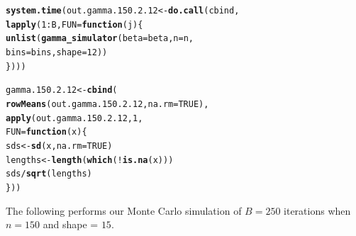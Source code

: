 \documentclass[11pt]{article}\usepackage[]{graphicx}\usepackage[]{color}
\makeatletter
\newcommand{\hlnum}[1]{\textcolor[rgb]{0.686,0.059,0.569}{#1}}%
\newcommand{\hlopt}[1]{\textcolor[rgb]{0,0,0}{#1}}%
\newcommand{\hlstd}[1]{\textcolor[rgb]{0.345,0.345,0.345}{#1}}%
\newcommand{\hlkwa}[1]{\textcolor[rgb]{0.161,0.373,0.58}{\textbf{#1}}}%
\newcommand{\hlkwb}[1]{\textcolor[rgb]{0.69,0.353,0.396}{#1}}%
\newcommand{\hlkwc}[1]{\textcolor[rgb]{0.333,0.667,0.333}{#1}}%
\newcommand{\hlkwd}[1]{\textcolor[rgb]{0.737,0.353,0.396}{\textbf{#1}}}%
\newenvironment{kframe}{%
 \def\at@end@of@kframe{}%
 \ifinner\ifhmode%
  \def\at@end@of@kframe{\end{minipage}}%
  \begin{minipage}{\columnwidth}%
 \fi\fi%
 \def\FrameCommand##1{\hskip\@totalleftmargin \hskip-\fboxsep
 \colorbox{shadecolor}{##1}\hskip-\fboxsep
     \hskip-\linewidth \hskip-\@totalleftmargin \hskip\columnwidth}%
 \MakeFramed {\advance\hsize-\width
   \@totalleftmargin\z@ \linewidth\hsize
   \@setminipage}}%
 {\par\unskip\endMakeFramed%
 \at@end@of@kframe}
\newenvironment{knitrout}{}{} %
\makeatother
\begin{document}
\begin{knitrout}
\color{fgcolor}\begin{kframe}
\begin{alltt}
\hlkwd{system.time}\hlstd{(out.gamma.150.2.12} \hlkwb{<-} \hlkwd{do.call}\hlstd{(cbind,}
  \hlkwd{lapply}\hlstd{(}\hlnum{1}\hlopt{:}\hlstd{B,} \hlkwc{FUN} \hlstd{=} \hlkwa{function}\hlstd{(}\hlkwc{j}\hlstd{)\{}
    \hlkwd{unlist}\hlstd{(}\hlkwd{gamma_simulator}\hlstd{(}\hlkwc{beta} \hlstd{= beta,} \hlkwc{n} \hlstd{= n,}
      \hlkwc{bins} \hlstd{= bins,} \hlkwc{shape} \hlstd{=} \hlnum{12}\hlstd{))}
\hlstd{\})))}
\end{alltt}


{\ttfamily\noindent\bfseries\color{errorcolor}{\#\# Error in eval(family\$initialize): non-positive values not allowed for the 'gamma' family}}

{\ttfamily\noindent\itshape\color{messagecolor}{\#\# Timing stopped at: 0.003 0 0.003}}\end{kframe}
\end{knitrout}

\begin{knitrout}
\color{fgcolor}\begin{kframe}
\begin{alltt}
\hlstd{gamma.150.2.12} \hlkwb{<-} \hlkwd{cbind}\hlstd{(}
  \hlkwd{rowMeans}\hlstd{(out.gamma.150.2.12,} \hlkwc{na.rm} \hlstd{=} \hlnum{TRUE}\hlstd{),}
  \hlkwd{apply}\hlstd{(out.gamma.150.2.12,} \hlnum{1}\hlstd{,}
  \hlkwc{FUN} \hlstd{=} \hlkwa{function}\hlstd{(}\hlkwc{x}\hlstd{)\{}
    \hlstd{sds} \hlkwb{<-} \hlkwd{sd}\hlstd{(x,} \hlkwc{na.rm} \hlstd{=} \hlnum{TRUE}\hlstd{)}
    \hlstd{lengths} \hlkwb{<-} \hlkwd{length}\hlstd{(}\hlkwd{which}\hlstd{(}\hlopt{!}\hlkwd{is.na}\hlstd{(x)))}
    \hlstd{sds} \hlopt{/} \hlkwd{sqrt}\hlstd{(lengths)}
  \hlstd{\}))}
\end{alltt}


{\ttfamily\noindent\bfseries\color{errorcolor}{\#\# Error in is.data.frame(x): object 'out.gamma.150.2.12' not found}}\end{kframe}
\end{knitrout}

The following performs our Monte Carlo simulation of $B = 250$ iterations 
when $n = 150$ and shape = $15$.
\end{document}
